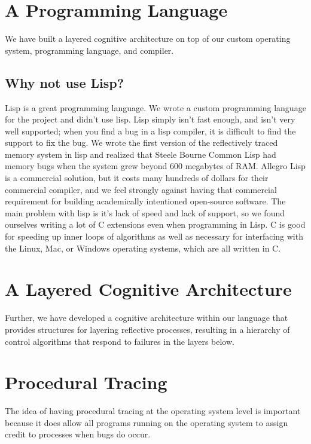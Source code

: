 \section{A Programming Language}

We have built a layered cognitive architecture on top of our custom
operating system, programming language, and compiler.

\subsection{Why not use Lisp?}

Lisp is a great programming language.  We wrote a custom programming
language for the project and didn't use lisp.  Lisp simply isn't fast
enough, and isn't very well supported; when you find a bug in a lisp
compiler, it is difficult to find the support to fix the bug.  We
wrote the first version of the reflectively traced memory system in
lisp and realized that Steele Bourne Common Lisp had memory bugs when
the system grew beyond 600 megabytes of RAM.  Allegro Lisp is a
commercial solution, but it costs many hundreds of dollars for their
commercial compiler, and we feel strongly against having that
commercial requirement for building academically intentioned
open-source software.  The main problem with lisp is it's lack of
speed and lack of support, so we found ourselves writing a lot of C
extensions even when programming in Lisp.  C is good for speeding up
inner loops of algorithms as well as necessary for interfacing with
the Linux, Mac, or Windows operating systems, which are all written in
C.

\section{A Layered Cognitive Architecture}

Further, we have developed a cognitive architecture within our
language that provides structures for layering reflective processes,
resulting in a hierarchy of control algorithms that respond to
failures in the layers below.




\section{Procedural Tracing}

The idea of having procedural tracing at the operating system level is
important because it does allow all programs running on the operating
system to assign credit to processes when bugs do occur.


